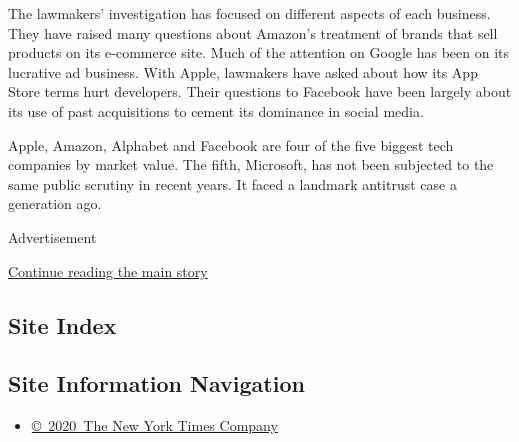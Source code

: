 The lawmakers' investigation has focused on different aspects of each
business. They have raised many questions about Amazon's treatment of
brands that sell products on its e-commerce site. Much of the attention
on Google has been on its lucrative ad business. With Apple, lawmakers
have asked about how its App Store terms hurt developers. Their
questions to Facebook have been largely about its use of past
acquisitions to cement its dominance in social media.

Apple, Amazon, Alphabet and Facebook are four of the five biggest tech
companies by market value. The fifth, Microsoft, has not been subjected
to the same public scrutiny in recent years. It faced a landmark
antitrust case a generation ago.

Advertisement

\protect\hyperlink{after-bottom}{Continue reading the main story}

\hypertarget{site-index}{%
\subsection{Site Index}\label{site-index}}

\hypertarget{site-information-navigation}{%
\subsection{Site Information
Navigation}\label{site-information-navigation}}

\begin{itemize}
\tightlist
\item
  \href{https://help.nytimes3xbfgragh.onion/hc/en-us/articles/115014792127-Copyright-notice}{©~2020~The
  New York Times Company}
\end{itemize}

